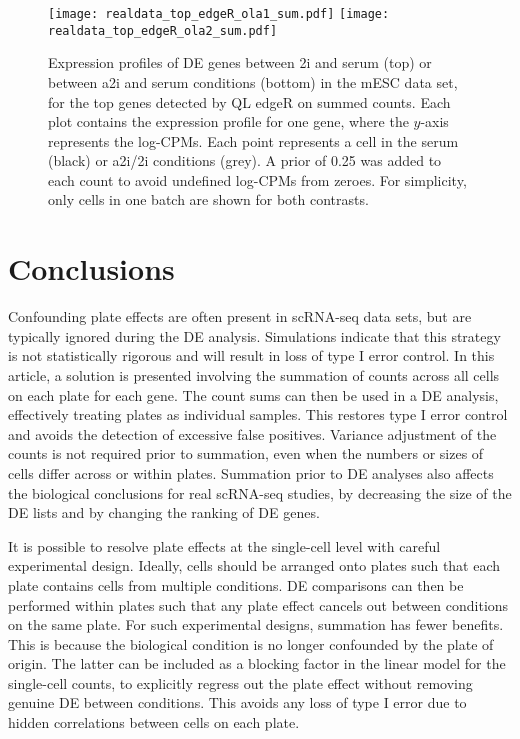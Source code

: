 \documentclass{article}
\begin{document}
\begin{figure}[bt]
    \begin{center}
        \texttt{[image: realdata\_top\_edgeR\_ola1\_sum.pdf]}
        \texttt{[image: realdata\_top\_edgeR\_ola2\_sum.pdf]}
    \end{center}
\caption{
    Expression profiles of DE genes between 2i and serum (top) or between a2i and serum conditions (bottom) in the mESC data set, 
        for the top genes detected by QL edgeR on summed counts.
    Each plot contains the expression profile for one gene, where the $y$-axis represents the log-CPMs.
    Each point represents a cell in the serum (black) or a2i/2i conditions (grey).
    A prior of 0.25 was added to each count to avoid undefined log-CPMs from zeroes.
    For simplicity, only cells in one batch are shown for both contrasts.
}
\label{fig:realdata}
\end{figure}


\section{Conclusions}
Confounding plate effects are often present in scRNA-seq data sets, but are typically ignored during the DE analysis.
Simulations indicate that this strategy is not statistically rigorous and will result in loss of type I error control. 
In this article, a solution is presented involving the summation of counts across all cells on each plate for each gene.
The count sums can then be used in a DE analysis, effectively treating plates as individual samples.
This restores type I error control and avoids the detection of excessive false positives.
Variance adjustment of the counts is not required prior to summation, even when the numbers or sizes of cells differ across or within plates.
Summation prior to DE analyses also affects the biological conclusions for real scRNA-seq studies, 
    by decreasing the size of the DE lists and by changing the ranking of DE genes.

It is possible to resolve plate effects at the single-cell level with careful experimental design.
Ideally, cells should be arranged onto plates such that each plate contains cells from multiple conditions.
DE comparisons can then be performed within plates such that any plate effect cancels out between conditions on the same plate.
For such experimental designs, summation has fewer benefits.
This is because the biological condition is no longer confounded by the plate of origin.
The latter can be included as a blocking factor in the linear model for the single-cell counts, 
    to explicitly regress out the plate effect without removing genuine DE between conditions.
This avoids any loss of type I error due to hidden correlations between cells on each plate.
\end{document}
